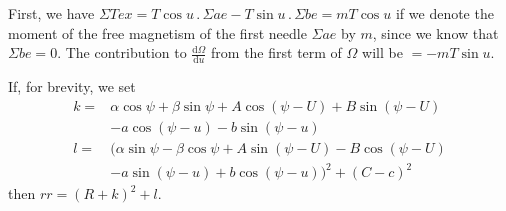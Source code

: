 First, we have $\Sigma Tex=T\cos u\, .\, \Sigma ae-T\sin u\, .\, \Sigma be=mT\cos u$ if we denote the moment of the free magnetism of the first needle $\Sigma ae$ by $m$, since we know that $\Sigma be=0$. The contribution to $\frac{\mathrm{d}\Omega}{\mathrm{d}u}$ from the first term of $\Omega$ will be $=-mT\sin u$.

If, for brevity, we set
\[
\begin{aligned}
k={}&\alpha\cos\psi+\beta\sin\psi+A\cos(\psi-U)+B\sin(\psi-U)\\
&-a\cos(\psi-u)-b\sin(\psi-u)\\
l={}&(\alpha\sin\psi-\beta\cos\psi+A\sin(\psi-U)-B\cos(\psi-U)\\
&-a\sin(\psi-u)+b\cos(\psi-u))^2+(C-c)^2
\end{aligned}
\]
then $rr=(R+k)^2+l$.


